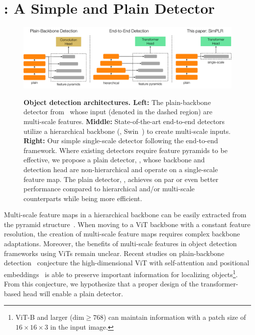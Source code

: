\section{\ours: A Simple and Plain Detector}
\label{sec:simplr}

\begin{figure}[t]
    \centering
    \includegraphics[width=\linewidth]{fig/compare1.pdf}\\
    \caption{
    \textbf{Object detection architectures. Left:} The plain-backbone detector from~\cite{li2022vitdet} whose input (denoted in the dashed region) are multi-scale features. \textbf{Middle:} State-of-the-art end-to-end detectors~\cite{nguyen2022boxer,cheng2022mask2former} utilize a hierarchical backbone (\ie, Swin~\cite{liu2021swintransformer}) to create multi-scale inputs. \textbf{Right:} Our simple single-scale detector following the end-to-end framework. Where existing detectors require feature pyramids to be effective, we propose a plain detector, \ours, whose backbone and detection head are non-hierarchical and operate on a single-scale feature map. The plain detector, \ours, achieves on par or even better performance compared to hierarchical and/or multi-scale counterparts while being more efficient.
    }\label{fig:compare}
\end{figure}

Multi-scale feature maps in a hierarchical backbone can be easily extracted from the pyramid structure~\cite{wei2016ssd,tsung2017fpn,zhu2021deformable}. When moving to a ViT backbone with a constant feature resolution, the creation of multi-scale feature maps requires complex backbone adaptations. Moreover, the benefits of multi-scale features in object detection frameworks using ViTs remain unclear. Recent studies on plain-backbone detection~\cite{li2022vitdet,chen2022uvit} conjecture the high-dimensional ViT with self-attention and positional embeddings~\cite{vaswani2017transformer} is able to preserve important information for localizing objects\footnote{ViT-B and larger ($\text{dim}\ge768$) can maintain information with a patch size of $16{\times}16{\times}3$ in the input image.}. From this conjecture, we hypothesize that a proper design of the transformer-based head will enable a plain detector.


